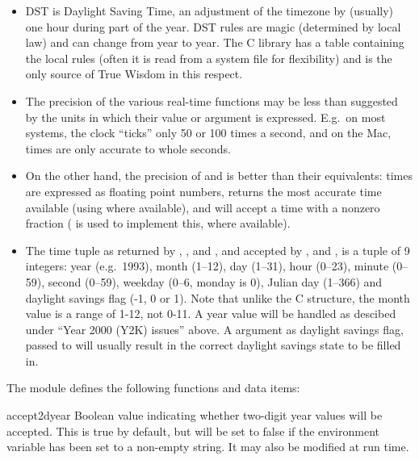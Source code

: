 \begin{itemize}
\item
DST is Daylight Saving Time, an adjustment
of the timezone by (usually) one hour during part of the year.  DST
rules are magic (determined by local law) and can change from year to
year.  The C library has a table containing the local rules (often it
is read from a system file for flexibility) and is the only source of
True Wisdom in this respect.

\item
The precision of the various real-time functions may be less than
suggested by the units in which their value or argument is expressed.
E.g.\ on most \UNIX{} systems, the clock ``ticks'' only 50 or 100 times a
second, and on the Mac, times are only accurate to whole seconds.

\item
On the other hand, the precision of  and
 is better than their \UNIX{} equivalents: times are
expressed as floating point numbers,  returns the
most accurate time available (using \UNIX{} 
where available), and  will accept a time with a
nonzero fraction (\UNIX{}  is used to implement
this, where available).

\item
The time tuple as returned by ,
, and , and accepted by
,  and ,
is a tuple of 9 integers: year (e.g.\ 1993), month (1--12), day
(1--31), hour (0--23), minute (0--59), second (0--59), weekday (0--6,
monday is 0), Julian day (1--366) and daylight savings flag (-1, 0 or
1).  Note that unlike the C structure, the month value is a range
of 1-12, not 0-11.  A year value will be handled as descibed under
``Year 2000 (Y2K) issues'' above.  A  argument as daylight
savings flag, passed to  will usually result in the
correct daylight savings state to be filled in.

\end{itemize}

The module defines the following functions and data items:


\begin{datadesc}{accept2dyear}
Boolean value indicating whether two-digit year values will be
accepted.  This is true by default, but will be set to false if the
environment variable  has been set to a non-empty
string.  It may also be modified at run time.
\end{datadesc}

